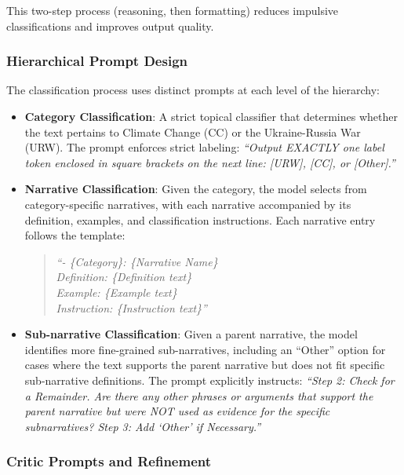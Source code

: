 \noindent This two-step process (reasoning, then formatting) reduces impulsive classifications and improves output quality.

\subsubsection{Hierarchical Prompt Design}

The classification process uses distinct prompts at each level of the hierarchy:
\begin{itemize}
\item \textbf{Category Classification}: A strict topical classifier that determines whether the text pertains to Climate Change (CC) or the Ukraine-Russia War (URW). The prompt enforces strict labeling: \textit{``Output EXACTLY one label token enclosed in square brackets on the next line: [URW], [CC], or [Other].''}

\item \textbf{Narrative Classification}: Given the category, the model selects from category-specific narratives, with each narrative accompanied by its definition, examples, and classification instructions. Each narrative entry follows the template:
\begin{quote}
\small
\textit{``- \{Category\}: \{Narrative Name\}\\
\hspace*{1em}Definition: \{Definition text\}\\
\hspace*{1em}Example: \{Example text\}\\
\hspace*{1em}Instruction: \{Instruction text\}''}
\end{quote}

\item \textbf{Sub-narrative Classification}: Given a parent narrative, the model identifies more fine-grained sub-narratives, including an ``Other'' option for cases where the text supports the parent narrative but does not fit specific sub-narrative definitions. The prompt explicitly instructs: \textit{``Step 2: Check for a Remainder. Are there any other phrases or arguments that support the parent narrative but were NOT used as evidence for the specific subnarratives? Step 3: Add `Other' if Necessary.''}
\end{itemize}

\subsubsection{Critic Prompts and Refinement}


